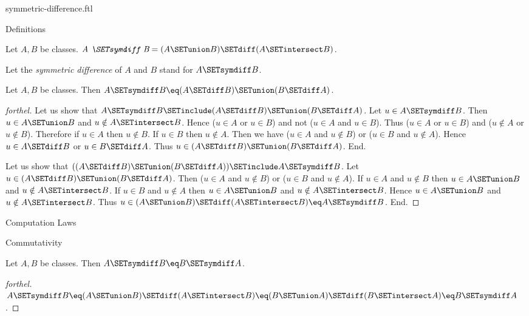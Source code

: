 \documentclass{naproche-library}
\begin{document}
\begin{smodule}[title=Symmetric Difference]{symmetric-difference.ftl}

\begin{sfragment}{Definitions}
  \begin{definition}[forthel,id=FOUNDATIONS_03_7457594151010304]
    Let $A, B$ be classes.
    $\emph{A \SETsymdiff B} = (A \SETunion B) \SETdiff (A \SETintersect B)$.

    Let the \emph{symmetric difference} of $A$ and $B$ stand for $A \SETsymdiff B$.
  \end{definition}

  \begin{proposition}[forthel,id=FOUNDATIONS_03_4886447211413504]
    Let $A, B$ be classes.
    Then $A \SETsymdiff B \eq (A \SETdiff B) \SETunion (B \SETdiff A)$.
  \end{proposition}
  \begin{proof}[forthel]
    Let us show that $A \SETsymdiff B \SETinclude (A \SETdiff B) \SETunion (B \SETdiff A)$.
      Let $u \in A \SETsymdiff B$.
      Then $u \in A \SETunion B$ and $u \notin A \SETintersect B$.
      Hence ($u \in A$ or $u \in B$) and not ($u \in A$ and $u \in B$).
      Thus ($u \in A$ or $u \in B$) and ($u \notin A$ or $u \notin B$).
      Therefore if $u \in A$ then $u \notin B$.
      If $u \in B$ then $u \notin A$.
      Then we have ($u \in A$ and $u \notin B$) or ($u \in B$ and $u \notin A$).
      Hence $u \in A \SETdiff B$ or $u \in B \SETdiff A$.
      Thus $u \in (A \SETdiff B) \SETunion (B \SETdiff A)$.
    End.

    Let us show that $((A \SETdiff B) \SETunion (B \SETdiff A)) \SETinclude A \SETsymdiff B$. %
      Let $u \in (A \SETdiff B) \SETunion (B \SETdiff A)$.
      Then ($u \in A$ and $u \notin B$) or ($u \in B$ and $u \notin A$).
      If $u \in A$ and $u \notin B$ then $u \in A \SETunion B$ and $u \notin A \SETintersect B$.
      If $u \in B$ and $u \notin A$ then $u \in A \SETunion B$ and $u \notin A \SETintersect B$.
      Hence $u \in A \SETunion B$ and $u \notin A \SETintersect B$.
      Thus $u \in (A \SETunion B) \SETdiff (A \SETintersect B) \eq A \SETsymdiff B$.
    End.
  \end{proof}
\end{sfragment}

\begin{sfragment}{Computation Laws}
  \begin{sfragment}{Commutativity}
    \begin{proposition}[forthel,id=FOUNDATIONS_03_4518372049944576]
      Let $A, B$ be classes.
      Then $A \SETsymdiff B \eq B \SETsymdiff A$.
    \end{proposition}
    \begin{proof}[forthel]
      $A \SETsymdiff B
        \eq (A \SETunion B) \SETdiff (A \SETintersect B)
        \eq (B \SETunion A) \SETdiff (B \SETintersect A)
        \eq B \SETsymdiff A$.
    \end{proof}
  \end{sfragment}


\end{sfragment}
\end{smodule}
\end{document}
